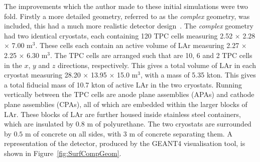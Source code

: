 The improvements which the author made to these initial simulations were two fold. Firstly a more detailed geometry, referred to as the \emph{complex} geometry, was included, this had a much more realistic detector design~\citep{LBNE3383}. The \emph{complex} geometry had two identical cryostats, each containing 120 TPC cells measuring 2.52 $\times$ 2.28 $\times$ 7.00 m$^3$. These cells each contain an active volume of LAr measuring 2.27 $\times$ 2.25 $\times$ 6.30 m$^3$. The TPC cells are arranged such that are 10, 6 and 2 TPC cells in the $x$, $y$ and $z$ directions, respectively. This gives a total volume of LAr in each cryostat measuring 28.20 $\times$ 13.95 $\times$ 15.0 m$^3$, with a mass of 5.35 kton. This gives a total fiducial mass of 10.7 kton of active LAr in the two cryostats. Running vertically between the TPC cells are anode plane assemblies (APAs) and cathode plane assemblies (CPAs), all of which are embedded within the larger blocks of LAr. These blocks of LAr are further housed inside stainless steel containers, which are insulated by $0.8$ m of polyurethane. The two cryostats are surrounded by $0.5$ m of concrete on all sides, with $3$ m of concrete separating them. A representation of the detector, produced by the GEANT4 visualisation tool, is shown in Figure~\ref{fig:SurfCompGeom}. \\


